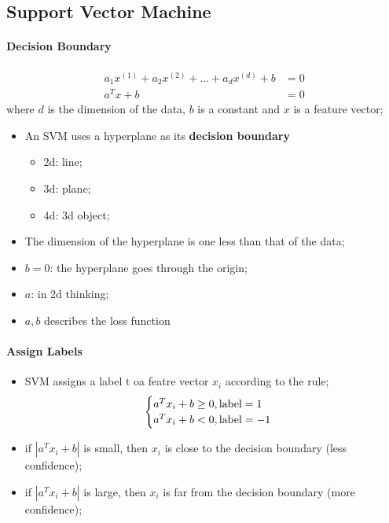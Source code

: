   \subsection{Support Vector Machine}
  
    \paragraph{Decision Boundary}
    \begin{align}
      a_{1} x^{(1)} + a_{2} x^{(2)} + ... + a_{d} x^{(d)} + b &= 0 \\
      a^{T} x + b &= 0
    \end{align}
    where $ d $ is the dimension of the data, $ b $ is a constant and $ x $ is a feature vector;
    
    \begin{itemize}
      \item An SVM uses a hyperplane as its \textbf{decision boundary}
      \begin{itemize}
        \item 2d: line;
        \item 3d: plane;
        \item 4d: 3d object;
      \end{itemize}
      
      \item The dimension of the hyperplane is one less than that of the data;
      \item $ b = 0 $: the hyperplane goes through the origin;
      \item $ a $:  in 2d thinking;
      \item $ a, b $ describes the loss function
    \end{itemize}
    
    \paragraph{Assign Labels}
    \begin{itemize}
      \item SVM assigns a label t oa featre vector $ x_{i} $ according to the rule;
      \begin{equation}
        \begin{cases}
          a^{T} x_{i} + b \ge 0, \text{\rmfamily label} = 1 \\
          a^{T} x_{i} + b < 0, \text{\rmfamily label} = -1 \\
        \end{cases}
      \end{equation}
      
      \item if $ \left| a^{T} x_{i} + b \right| $ is small, then $ x_{i} $ is close to the decision boundary (less confidence);
      \item if $ \left| a^{T} x_{i} + b \right| $ is large, then $ x_{i} $ is far from the decision boundary (more confidence);
    \end{itemize}
    
